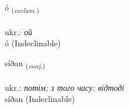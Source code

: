 \documentclass[frontgrid, backgrid]{flacards}\usepackage[]{graphicx}\usepackage[]{xcolor}
\begin{document}

\renewcommand{\flhead}{\vskip5pt \fboxsep=0pt {\small\bfseries\footnotesize Upphrópanir | вигук}}
\renewcommand{\fcfoot}{\vskip5pt \fboxsep=0pt \hspace{2pt}{\small\bfseries\footnotesize 3K}}

\renewcommand{\blhead}{\vskip5pt {\small\bfseries\footnotesize Upphrópanir | вигук }}
\renewcommand{\bcfoot}{\vskip5pt \hspace{2pt}{\small\bfseries\footnotesize 3K}}


{ó \small{\textsubscript{(\textit{exclam.})}} \\[1ex]
\textphonetic{[ouː]} \\
ukr.: \emph{ой} \\  [2ex]
ó (Indeclinable)}


\renewcommand{\flhead}{\vskip5pt \fboxsep=0pt {\small\bfseries\footnotesize Samtenging | сполучник}}
\renewcommand{\fcfoot}{\vskip5pt \fboxsep=0pt \hspace{2pt}{\small\bfseries\footnotesize 3K}}

\renewcommand{\blhead}{\vskip5pt {\small\bfseries\footnotesize Samtenging | сполучник }}
\renewcommand{\bcfoot}{\vskip5pt \hspace{2pt}{\small\bfseries\footnotesize 3K}}


{síðan \small{\textsubscript{(\textit{conj.})}} \\[1ex]
\textphonetic{[siːðan]} \\
ukr.: \emph{потім; з того часу; відтоді} \\  [2ex]
síðan (Indeclinable)}

\renewcommand{\flhead}{\vskip5pt \fboxsep=0pt {\small\bfseries\footnotesize Sagnorð | дієслово}}
\renewcommand{\fcfoot}{\vskip5pt \fboxsep=0pt \hspace{2pt}{\small\bfseries\footnotesize 3K}}

\renewcommand{\blhead}{\vskip5pt {\small\bfseries\footnotesize Sagnorð | дієслово }}
\renewcommand{\bcfoot}{\vskip5pt \hspace{2pt}{\small\bfseries\footnotesize 3K}}
\end{document}
